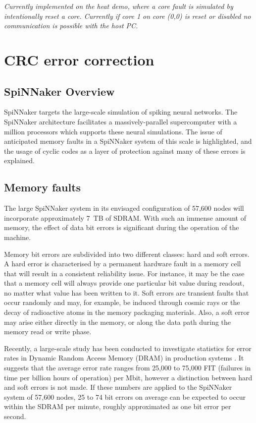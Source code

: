 \documentclass[a4paper, 11pt]{article}
\begin{document}
\emph{Currently implemented on the heat demo, where a core fault is simulated by intentionally reset a core. Currently if core 1 on core (0,0) is reset or disabled no communication is possible with the host PC.}


\clearpage
\section{CRC error correction}
\label{sec:crc}

\subsection{SpiNNaker Overview}
SpiNNaker targets the large-scale simulation of spiking neural networks. The SpiNNaker architecture facilitates a massively-parallel supercomputer with a million processors which supports these neural simulations. The issue of anticipated memory faults in a SpiNNaker system of this scale is highlighted, and the usage of cyclic codes as a layer of protection against many of these errors is explained.

\subsection{Memory faults}
The large SpiNNaker system in its envisaged configuration of 57,600 nodes will incorporate approximately 7~TB of SDRAM. With such an immense amount of memory, the effect of data bit errors is significant during the operation of the machine.

Memory bit errors are subdivided into two different classes: hard and soft errors. A hard error is characterised by a permanent hardware fault in a memory cell that will result in a consistent reliability issue. For instance, it may be the case that a memory cell will always provide one particular bit value during readout, no matter what value has been written to it. Soft errors are transient faults that occur randomly and may, for example, be induced through cosmic rays or the decay of radioactive atoms in the memory packaging materials. Also, a soft error may arise either directly in the memory, or along the data path during the memory read or write phase.

Recently, a large-scale study has been conducted to investigate statistics for error rates in Dynamic Random Access Memory (DRAM) in production systems \citep{schroeder2009dram}. It suggests that the average error rate ranges from 25,000 to 75,000 FIT (failures in time per billion hours of operation) per Mbit, however a distinction between hard and soft errors is not made. If these numbers are applied to the SpiNNaker system of 57,600 nodes, 25 to 74 bit errors on average can be expected to occur within the SDRAM per minute, roughly approximated as one bit error per second.
\end{document}
